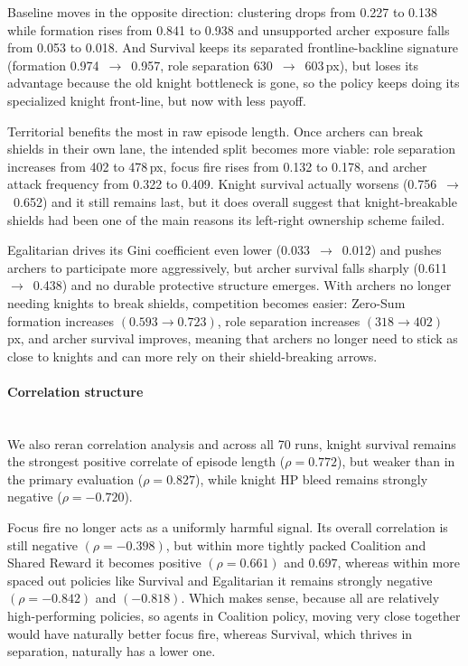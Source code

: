 Baseline moves in the opposite direction: clustering drops from 0.227 to 0.138 while formation rises from 0.841 to 0.938 and unsupported archer exposure falls from 0.053 to 0.018. And Survival keeps its separated frontline-backline signature (formation 0.974~$\to$~0.957, role separation 630~$\to$~603\,px), but loses its advantage because the old knight bottleneck is gone, so the policy keeps doing its specialized knight front-line, but now with less payoff.

Territorial benefits the most in raw episode length. Once archers can break shields in their own lane, the intended split becomes more viable: role separation increases from 402 to 478\,px, focus fire rises from 0.132 to 0.178, and archer attack frequency from 0.322 to 0.409. Knight survival actually worsens (0.756~$\to$~0.652) and it still remains last, but it does overall suggest that knight-breakable shields had been one of the main reasons its left-right ownership scheme failed.

Egalitarian drives its Gini coefficient even lower (0.033~$\to$~0.012) and pushes archers to participate more aggressively, but archer survival falls sharply (0.611~$\to$~0.438) and no durable protective structure emerges. With archers no longer needing knights to break shields, competition becomes easier: Zero-Sum formation increases $(0.593\to0.723)$, role separation increases $(318\to402)$\,px, and archer survival improves, meaning that archers no longer need to stick as close to knights and can more rely on their shield-breaking arrows.

\paragraph{Correlation structure}\mbox{}\\
We also reran correlation analysis and across all 70 runs, knight survival remains the strongest positive correlate of episode length ($\rho = 0.772$), but weaker than in the primary evaluation ($\rho = 0.827$), while knight HP bleed remains strongly negative ($\rho = -0.720$).

Focus fire no longer acts as a uniformly harmful signal. Its overall correlation is still negative $(\rho = -0.398)$, but within more tightly packed Coalition and Shared Reward it becomes positive $(\rho = 0.661)$ and $0.697$, whereas within more spaced out policies like Survival and Egalitarian it remains strongly negative $(\rho = -0.842)$ and $(-0.818)$. Which makes sense, because all are relatively high-performing  policies, so agents in Coalition policy, moving very close together would have naturally better focus fire, whereas Survival, which thrives in separation, naturally has a lower one.

